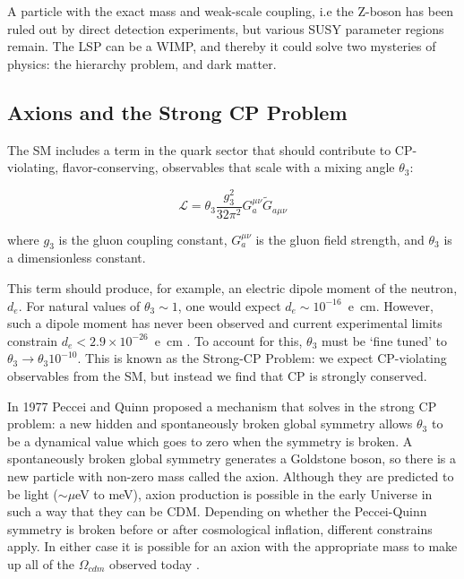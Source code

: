 A particle with the exact mass and weak-scale coupling, i.e the Z-boson has been ruled out by direct detection experiments, but various \ac{SUSY} parameter regions remain. The \ac{LSP} can be a \ac{WIMP}, and thereby it could solve two mysteries of physics: the hierarchy problem, and dark matter. 

\subsection{Axions and the Strong CP Problem}
The \ac{SM} includes a term in the quark sector that should contribute to CP-violating, flavor-conserving, observables that scale with a mixing angle $\theta_{3}$:

\begin{equation}
\mathcal{L} = \theta_{3} \frac{g_{3}^{2}}{32 \pi^{2}} G^{\mu \nu}_{a} \tilde{G}_{a \mu \nu}
\end{equation}

where $g_{3}$ is the gluon coupling constant, $G^{\mu \nu}_{a}$ is the gluon field strength, and $\theta_{3}$ is a dimensionless constant.

This term should produce, for example, an electric dipole moment of the neutron, $d_{e}$. For natural values of $\theta_{3} \sim 1$,  one would expect $d_{e} \sim10^{-16}$~e~cm. However, such a dipole moment has never been observed and current experimental limits constrain $d_{e} < 2.9 \times 10^{-26}$~e~cm \cite{Feng2010}. To account for this, $\theta_{3}$ must be `fine tuned' to $\theta_{3} \longrightarrow \theta_{3}10^{-10}$. This is known as the Strong-CP Problem: we expect CP-violating observables from the \ac{SM}, but instead we find that CP is strongly conserved.

In 1977 Peccei and Quinn proposed a mechanism that solves in the strong CP problem: a new hidden and spontaneously broken global symmetry allows $\theta_{3}$ to be a dynamical value which goes to zero when the symmetry is broken. A spontaneously broken global symmetry generates a Goldstone boson, so there is a new particle with non-zero mass called the axion. Although they are predicted to be light ($\sim \mu$eV to meV), axion production is possible in the early Universe in such a way that they can be \ac{CDM}. Depending on whether the Peccei-Quinn symmetry is broken before or after cosmological inflation, different constrains apply. In either case it is possible for an axion with the appropriate mass to make up all of the $\Omega_{cdm}$ observed today \cite{PDGAxions2017}.



